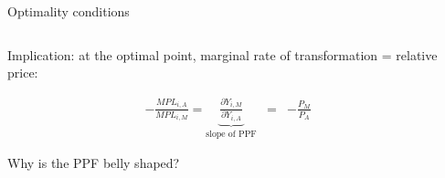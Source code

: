 \documentclass[notes,11pt, aspectratio=169, xcolor=table]{beamer}
\newenvironment{wideitemize}{\itemize\addtolength{\itemsep}{10pt}}{\enditemize}
\begin{document}
\begin{frame}{Optimality conditions}

\begin{columns}[T] %
\begin{column}{.35\textwidth}
        \begin{wideitemize}
            
        
                \item Implication: at the optimal point, marginal rate of transformation = relative price:
        
                \begin{eqnarray*}
                     - \frac{MPL_{i,A}}{MPL_{i,M}} = \underbrace{\frac{\partial Y_{i,M}}{\partial Y_{i,A}}}_{\text{slope of PPF}}  &=& - \frac{P_{M}}{P_{A}}
                \end{eqnarray*}

                \item<3-> Why is the PPF belly shaped?
        
                
        \end{wideitemize}    
                
    \end{column}
    \begin{column}{.55\textwidth}
\end{column}
\end{columns}
\end{frame}
\end{document}
